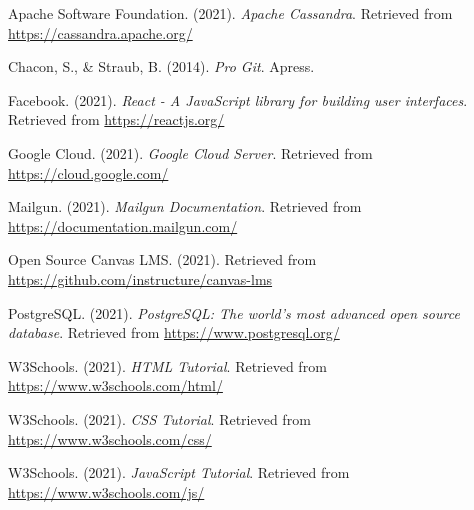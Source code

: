 \documentclass[a4paper,12pt,oneside]{report}
\theoremstyle{definition}
\begin{document}
\renewcommand{\bibname}{Tài liệu tham khảo}
\begin{thebibliography}{9}

  Apache Software Foundation. (2021). \textit{Apache Cassandra}. Retrieved from \url{https://cassandra.apache.org/}
  
  Chacon, S., \& Straub, B. (2014). \textit{Pro Git}. Apress.
  
  Facebook. (2021). \textit{React - A JavaScript library for building user interfaces}. Retrieved from \url{https://reactjs.org/}
  
  Google Cloud. (2021). \textit{Google Cloud Server}. Retrieved from \url{https://cloud.google.com/}
  
  Mailgun. (2021). \textit{Mailgun Documentation}. Retrieved from \url{https://documentation.mailgun.com/}
  
  Open Source Canvas LMS. (2021). Retrieved from \url{https://github.com/instructure/canvas-lms}
  
  PostgreSQL. (2021). \textit{PostgreSQL: The world's most advanced open source database}. Retrieved from \url{https://www.postgresql.org/}
  
  W3Schools. (2021). \textit{HTML Tutorial}. Retrieved from \url{https://www.w3schools.com/html/}
  
  W3Schools. (2021). \textit{CSS Tutorial}. Retrieved from \url{https://www.w3schools.com/css/}
  
  W3Schools. (2021). \textit{JavaScript Tutorial}. Retrieved from \url{https://www.w3schools.com/js/}
  
\end{thebibliography}
  
\nocite{*} %
\pagestyle{plain}
\end{document}
